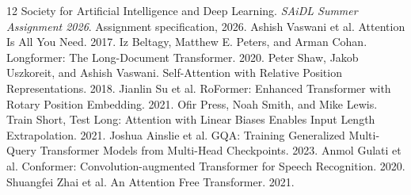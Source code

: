 \documentclass[11pt]{article}
\begin{document}
\begin{thebibliography}{12}
 Society for Artificial Intelligence and Deep Learning. \emph{SAiDL Summer Assignment 2026}. Assignment specification, 2026.
 Ashish Vaswani et al. Attention Is All You Need. 2017.
 Iz Beltagy, Matthew E. Peters, and Arman Cohan. Longformer: The Long-Document Transformer. 2020.
 Peter Shaw, Jakob Uszkoreit, and Ashish Vaswani. Self-Attention with Relative Position Representations. 2018.
 Jianlin Su et al. RoFormer: Enhanced Transformer with Rotary Position Embedding. 2021.
 Ofir Press, Noah Smith, and Mike Lewis. Train Short, Test Long: Attention with Linear Biases Enables Input Length Extrapolation. 2021.
 Joshua Ainslie et al. GQA: Training Generalized Multi-Query Transformer Models from Multi-Head Checkpoints. 2023.
 Anmol Gulati et al. Conformer: Convolution-augmented Transformer for Speech Recognition. 2020.
 Shuangfei Zhai et al. An Attention Free Transformer. 2021.
\end{thebibliography}
\end{document}
